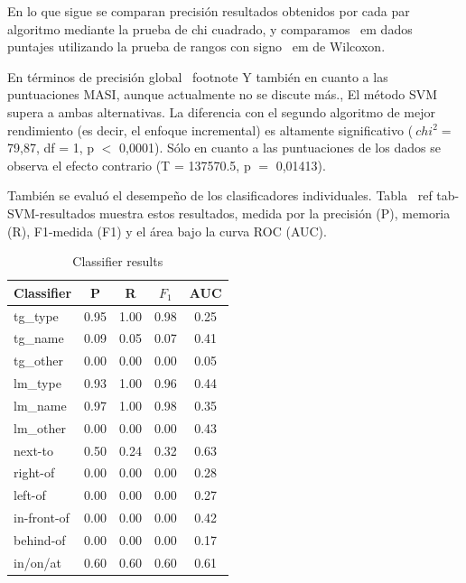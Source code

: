 En lo que sigue se comparan precisi\'on resultados obtenidos por cada par algoritmo mediante la prueba de chi cuadrado, y comparamos {\ em dados} puntajes utilizando la prueba de rangos con signo {\ em de Wilcoxon}.

En t\'erminos de precisi\'on global \ footnote {Y tambi\'en en cuanto a las puntuaciones MASI, aunque actualmente no se discute m\'as.}, El m\'etodo SVM supera a ambas alternativas. La diferencia con el segundo algoritmo de mejor rendimiento (es decir, el enfoque incremental) es altamente significativo ($ \ chi ^ {2} = $ 79,87, df = 1, p $ <$ 0,0001). S\'olo en cuanto a las puntuaciones de los dados se observa el efecto contrario (T = 137570.5, p $ = $ 0,01413).

Tambi\'en se evalu\'o el desempe\~no de los clasificadores individuales. Tabla \ ref {tab-SVM-resultados} muestra estos resultados, medida por la precisi\'on (P), memoria (R), F1-medida (F1) y el \'area bajo la curva ROC (AUC).

\begin{table}[ht]
\begin{center}
\footnotesize{
\caption{Classifier results}
\begin{tabular}{l c c c c }
\hline
{{Classifier}}	& {P} & {R} & {$F_{1}$} & {AUC} \\
\hline
{{tg\_type}} 			& 0.95 & 1.00 & 0.98 & 0.25 \\
{{tg\_name}}			& 0.09 & 0.05 & 0.07 & 0.41 \\
{{tg\_other}}			& 0.00 & 0.00 & 0.00 & 0.05 \\                               
{{lm\_type}}			& 0.93 & 1.00 & 0.96 & 0.44 \\                               
{{lm\_name}}			& 0.97 & 1.00 & 0.98 & 0.35 \\                               
{{lm\_other}}			& 0.00 & 0.00 & 0.00 & 0.43 \\                               
{{next-to}}				& 0.50 & 0.24 & 0.32 & 0.63 \\                               
{{right-of}}			& 0.00 & 0.00 & 0.00 & 0.28 \\                               
{{left-of}}				& 0.00 & 0.00 & 0.00 & 0.27 \\                               
{{in-front-of}}		& 0.00 & 0.00 & 0.00 & 0.42 \\                               
{{behind-of}}			& 0.00 & 0.00 & 0.00 & 0.17 \\                               
{{in/on/at}} 			& 0.60 & 0.60 & 0.60 & 0.61 \\                               
\hline                   
\end{tabular}
\label{tab-svm-results}
}
\end{center}
\end{table}
\normalsize


